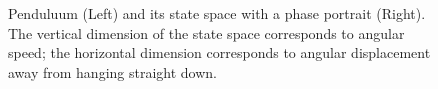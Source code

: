 \begin{figure}[h]
\centering
{}
\hspace*{.8in}
\caption[Left: From \url{https://commons.wikimedia.org/wiki/File:Simple_gravity_pendulum.svg}; Right: Scott Hotton.]{Penduluum (Left) and its state space with a phase portrait (Right). The vertical dimension of the state space corresponds to angular speed; the horizontal dimension corresponds to angular displacement away from hanging straight down.}
\label{F:pendulumStateSpace}
\end{figure}

